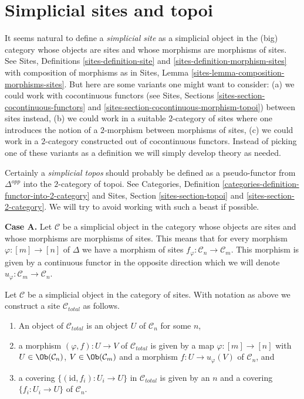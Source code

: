 \section{Simplicial sites and topoi}
\label{section-simplicial-sites}

\noindent
It seems natural to define a {\it simplicial site} as a simplicial
object in the (big) category whose objects are sites
and whose morphisms are morphisms of sites.
See Sites, Definitions \ref{sites-definition-site} and
\ref{sites-definition-morphism-sites}
with composition of morphisms as in 
Sites, Lemma \ref{sites-lemma-composition-morphisms-sites}.
But here are some variants one might want to consider:
(a) we could work with cocontinuous functors
(see Sites, Sections \ref{sites-section-cocontinuous-functors} and
\ref{sites-section-cocontinuous-morphism-topoi}) between sites instead,
(b) we could work in a suitable $2$-category of sites where one introduces
the notion of a $2$-morphism between morphisms of sites,
(c) we could work in a $2$-category constructed out of cocontinuous
functors. Instead of picking one of these variants as a definition
we will simply develop theory as needed.

\medskip\noindent
Certainly a {\it simplicial topos} should probably be defined as a
pseudo-functor from $\Delta^{opp}$ into the $2$-category of topoi.
See Categories, Definition \ref{categories-definition-functor-into-2-category}
and Sites, Section \ref{sites-section-topoi} and
\ref{sites-section-2-category}. We will try to avoid working with such
a beast if possible.

\medskip\noindent
{\bf Case A.}
Let $\mathcal{C}$ be a simplicial object in the category whose objects
are sites and whose morphisms are morphisms of sites. This means that
for every morphism $\varphi : [m] \to [n]$ of $\Delta$ we have a morphism
of sites $f_\varphi : \mathcal{C}_n \to \mathcal{C}_m$. This morphism is
given by a continuous functor in the opposite direction which we will denote
$u_\varphi : \mathcal{C}_m \to \mathcal{C}_n$.

\begin{lemma}
\label{lemma-simplicial-site-site}
Let $\mathcal{C}$ be a simplicial object in the category of sites.
With notation as above we construct a site $\mathcal{C}_{total}$ as follows.
\begin{enumerate}
\item An object of $\mathcal{C}_{total}$ is an object $U$ of
$\mathcal{C}_n$ for some $n$,
\item a morphism $(\varphi, f) : U \to V$ of $\mathcal{C}_{total}$
is given by a map $\varphi : [m] \to [n]$ with
$U \in \Ob(\mathcal{C}_n)$, $V \in \Ob(\mathcal{C}_m)$
and a morphism $f : U \to u_\varphi(V)$ of $\mathcal{C}_n$, and
\item a covering $\{(\text{id}, f_i) :  U_i \to U\}$ in $\mathcal{C}_{total}$
is given by an $n$ and a covering $\{f_i : U_i \to U\}$
of $\mathcal{C}_n$.
\end{enumerate}
\end{lemma}

